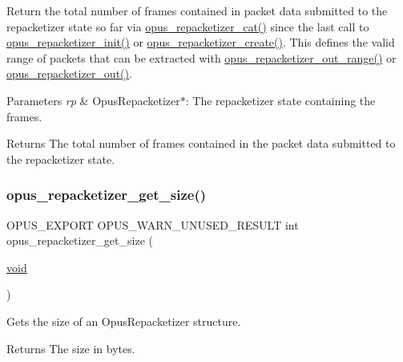 Return the total number of frames contained in packet data submitted to the repacketizer state so far via \mbox{\hyperlink{group__opus__repacketizer_gaa739f0bbc0ad09ad159ffb6455a6bb55}{opus\+\_\+repacketizer\+\_\+cat()}} since the last call to \mbox{\hyperlink{group__opus__repacketizer_gadef533688e80dcc96a32b955657aaf28}{opus\+\_\+repacketizer\+\_\+init()}} or \mbox{\hyperlink{group__opus__repacketizer_gaa70e9708619188f673b5dc3f494c46ea}{opus\+\_\+repacketizer\+\_\+create()}}. This defines the valid range of packets that can be extracted with \mbox{\hyperlink{group__opus__repacketizer_gad06762a8f4032823f6b64b63e8416efc}{opus\+\_\+repacketizer\+\_\+out\+\_\+range()}} or \mbox{\hyperlink{group__opus__repacketizer_gaa1b5f68279829dcbaf31d374b2f3eac4}{opus\+\_\+repacketizer\+\_\+out()}}. 
\begin{DoxyParams}{Parameters}
{\em rp} & {\ttfamily Opus\+Repacketizer$\ast$}\+: The repacketizer state containing the frames. \\
\hline
\end{DoxyParams}
\begin{DoxyReturn}{Returns}
The total number of frames contained in the packet data submitted to the repacketizer state. 
\end{DoxyReturn}
\mbox{\label{group__opus__repacketizer_ga833b745bf92317e9ac26797a56eba6fd}} 
\subsubsection{\texorpdfstring{opus\_repacketizer\_get\_size()}{opus\_repacketizer\_get\_size()}}
{\footnotesize\ttfamily O\+P\+U\+S\+\_\+\+E\+X\+P\+O\+RT O\+P\+U\+S\+\_\+\+W\+A\+R\+N\+\_\+\+U\+N\+U\+S\+E\+D\+\_\+\+R\+E\+S\+U\+LT int opus\+\_\+repacketizer\+\_\+get\+\_\+size (\begin{DoxyParamCaption}\item[{\mbox{\hyperlink{_s_d_l__opengles2__gl2ext_8h_ae5d8fa23ad07c48bb609509eae494c95}{void}}}]{ }\end{DoxyParamCaption})}

Gets the size of an {\ttfamily Opus\+Repacketizer} structure. \begin{DoxyReturn}{Returns}
The size in bytes. 
\end{DoxyReturn}
\mbox{\label{group__opus__repacketizer_gadef533688e80dcc96a32b955657aaf28}} 
